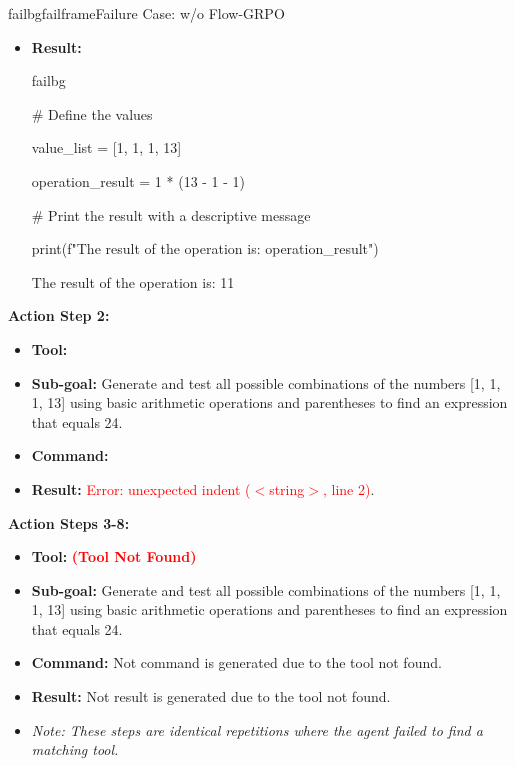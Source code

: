 \begin{small}
\begin{center}
\begin{casebox}{failbg}{failframe}{Failure Case: \model w/o Flow-GRPO}
\begin{itemize}[nosep, leftmargin=*]
        \item \textbf{Result:}
        \begin{casecode}{failbg}
        
            \# Define the values
            
            value\_list = [1, 1, 1, 13]
            
            operation\_result = 1 * (13 - 1 - 1)
            
            \# Print the result with a descriptive message
            
            print(f"The result of the operation is: {operation\_result}")
        \end{casecode}
        The result of the operation is: 11
    \end{itemize}

    \vspace{1em}

    \textbf{Action Step 2:}
    \begin{itemize}[nosep, leftmargin=*]
        \item \textbf{Tool:} 
        \item \textbf{Sub-goal:} Generate and test all possible combinations of the numbers [1, 1, 1, 13] using basic arithmetic operations and parentheses to find an expression that equals 24.
        \item \textbf{Command:}
        
        \item \textbf{Result:} \textcolor{red}{Error: unexpected indent ($<$string$>$, line 2)}.
    \end{itemize}

    \vspace{1em}


    \textbf{Action Steps 3-8:}
    \begin{itemize}[nosep, leftmargin=*]
        \item \textbf{Tool:}  \textcolor{red}{\textbf{(Tool Not Found)}}
        \item \textbf{Sub-goal:} Generate and test all possible combinations of the numbers [1, 1, 1, 13] using basic arithmetic operations and parentheses to find an expression that equals 24.
        \item \textbf{Command:} Not command is generated due to the tool not found.
        \item \textbf{Result:} Not result is generated due to the tool not found.
        \item \textit{Note: These steps are identical repetitions where the agent failed to find a matching tool.}
    \end{itemize}


\end{casebox}
\end{center}
\end{small}
